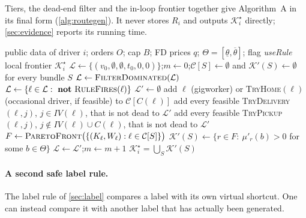 \documentclass[11pt]{article}
\theoremstyle{definition}
\theoremstyle{remark}
\newcommand{\Ks}{\mathcal{K}^{\star}}
\newcommand{\thl}{\underline{\theta}}
\newcommand{\thu}{\overline{\theta}}
\begin{document}
Tiers, the dead-end filter and the in-loop frontier together give Algorithm~A in
its final form (\cref{alg:routegen}). It never stores $R_i$ and outputs $\Ks_i$
directly; \cref{sec:evidence} reports its running time.

\begin{algorithm}[!htbp]
\caption{\textsc{GenerateRoutes}$(i)$: Algorithm A for one driver (final version: event tiers, dead-end filter, frontier inside the loop)}
\label{alg:routegen}
\begin{algorithmic}[1]
\Require public data of driver $i$; orders $O$; cap $B$; FD prices $q$; $\Theta=[\thl,\thu]$; flag \textit{useRule}
\Ensure local frontier $\Ks_i$
\State $\mathcal L\gets\{(v_0,\emptyset,\emptyset,t_0,0,0)\}$;\quad $m\gets0$;\quad $\mathcal C[S]\gets\emptyset$ and $\mathcal K'(S)\gets\emptyset$ for every bundle $S$
 
  \State $\mathcal L\gets\textsc{FilterDominated}(\mathcal L)$ 
   $\mathcal L\gets\{\ell\in\mathcal L:\ \textbf{not}\ \textsc{RuleFires}(\ell)\}$ 
  \EndIf
  \State $\mathcal L'\gets\emptyset$
      \State add $\ell$ (gigworker) or \textsc{TryHome}$(\ell)$ (occasional driver, if feasible) to $\mathcal C[C(\ell)]$
    \EndIf
    \State add every feasible \textsc{TryDelivery}$(\ell,j)$, $j\in IV(\ell)$, that is not dead to $\mathcal L'$ 
      \State add every feasible \textsc{TryPickup}$(\ell,j)$, $j\notin IV(\ell)\cup C(\ell)$, that is not dead to $\mathcal L'$
    \EndIf
  \EndFor
   
      \State $F\gets\textsc{ParetoFront}\bigl(\{(K_\ell,W_\ell):\ell\in\mathcal C[S]\}\bigr)$ 
      \State $\mathcal K'(S)\gets\{r\in F:\ \mu'_r(b)>0$ for some $b\in\Theta\}$ 
    \EndFor
  \EndIf
  \State $\mathcal L\gets\mathcal L'$;\quad $m\gets m+1$
\EndWhile
\State \Return $\Ks_i=\bigcup_S\mathcal K'(S)$
\end{algorithmic}
\end{algorithm}

\paragraph{A second safe label rule.} The label rule of \cref{sec:label}
compares a label with its own virtual shortcut. One can instead compare it with
another label that has actually been generated.
\end{document}
